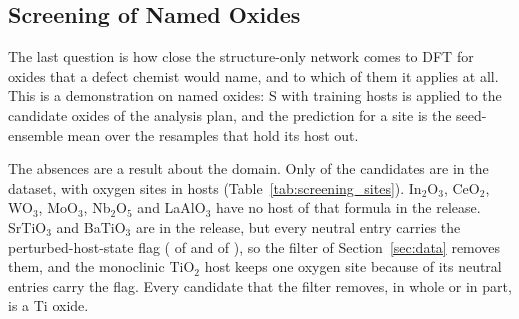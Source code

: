\subsection{Screening of Named Oxides}
\label{sec:screening}

The last question is how close the structure-only network comes to DFT for oxides that a defect chemist would name, and to which of them it applies at all. This is a demonstration on named oxides: S with \numNetScreenBudget{} training hosts is applied to the \numScreeningDemoScopeNCandidates{} candidate oxides of the analysis plan, and the prediction for a site is the seed-ensemble mean over the resamples that hold its host out.

The absences are a result about the domain. Only \numScreeningDemoScopeNPresent{} of the \numScreeningDemoScopeNCandidates{} candidates are in the dataset, with \numNetScreenSites{} oxygen sites in \numNetScreenHosts{} hosts (Table~\ref{tab:screening_sites}). In$_2$O$_3$, CeO$_2$, WO$_3$, MoO$_3$, Nb$_2$O$_5$ and LaAlO$_3$ have no host of that formula in the release. SrTiO$_3$ and BaTiO$_3$ are in the release, but every neutral entry carries the perturbed-host-state flag (\numScreeningDemoScopePhsRemovedSrTiOThreePhsEntries{} of \numScreeningDemoScopePhsRemovedSrTiOThreeNeutralEntries{} and \numScreeningDemoScopePhsRemovedBaTiOThreePhsEntries{} of \numScreeningDemoScopePhsRemovedBaTiOThreeNeutralEntries{}), so the filter of Section~\ref{sec:data} removes them, and the monoclinic TiO$_2$ host keeps one oxygen site because \numScreeningDemoScopeTioTwoReleasePhsEntries{} of its \numScreeningDemoScopeTioTwoReleaseNeutralEntries{} neutral entries carry the flag. Every candidate that the filter removes, in whole or in part, is a Ti oxide.

